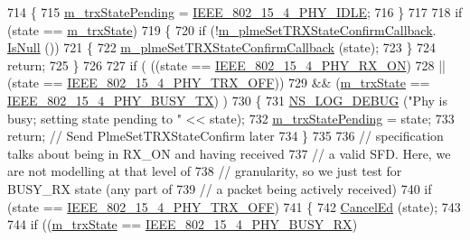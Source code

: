 \begin{DoxyCode}
714     \{
715       \hyperlink{classns3_1_1LrWpanPhy_a84647014f5242767e3358a6a851c81a7}{m\_trxStatePending} = \hyperlink{group__lr-wpan_gga6494269d13d45c511a07b7ccbb1de754af3994414efcd2fac7e312ecb9b3ebd70}{IEEE\_802\_15\_4\_PHY\_IDLE};
716     \}
717 
718   \textcolor{keywordflow}{if} (state == \hyperlink{classns3_1_1LrWpanPhy_a316704a4eb96e04f4b960ba3577fe0ce}{m\_trxState})
719     \{
720       \textcolor{keywordflow}{if} (!\hyperlink{classns3_1_1LrWpanPhy_ab3fed0e994f9e51e765c704f1a7b666f}{m\_plmeSetTRXStateConfirmCallback}.
      \hyperlink{classns3_1_1Callback_aa8e27826badbf37f84763f36f70d9b54}{IsNull} ())
721         \{
722           \hyperlink{classns3_1_1LrWpanPhy_ab3fed0e994f9e51e765c704f1a7b666f}{m\_plmeSetTRXStateConfirmCallback} (state);
723         \}
724       \textcolor{keywordflow}{return};
725     \}
726 
727   \textcolor{keywordflow}{if} ( ((state == \hyperlink{group__lr-wpan_gga6494269d13d45c511a07b7ccbb1de754a9480f69fea1a74b7961ed74d6b3e2f9e}{IEEE\_802\_15\_4\_PHY\_RX\_ON})
728         || (state == \hyperlink{group__lr-wpan_gga6494269d13d45c511a07b7ccbb1de754a4c0fd3882b68301deb8ce5b03109058f}{IEEE\_802\_15\_4\_PHY\_TRX\_OFF}))
729        && (\hyperlink{classns3_1_1LrWpanPhy_a316704a4eb96e04f4b960ba3577fe0ce}{m\_trxState} == \hyperlink{group__lr-wpan_gga6494269d13d45c511a07b7ccbb1de754a87f658959801356265b8c28a85569b15}{IEEE\_802\_15\_4\_PHY\_BUSY\_TX}) )
730     \{
731       \hyperlink{group__logging_ga413f1886406d49f59a6a0a89b77b4d0a}{NS\_LOG\_DEBUG} (\textcolor{stringliteral}{"Phy is busy; setting state pending to "} << state);
732       \hyperlink{classns3_1_1LrWpanPhy_a84647014f5242767e3358a6a851c81a7}{m\_trxStatePending} = state;
733       \textcolor{keywordflow}{return};  \textcolor{comment}{// Send PlmeSetTRXStateConfirm later}
734     \}
735 
736   \textcolor{comment}{// specification talks about being in RX\_ON and having received}
737   \textcolor{comment}{// a valid SFD.  Here, we are not modelling at that level of}
738   \textcolor{comment}{// granularity, so we just test for BUSY\_RX state (any part of}
739   \textcolor{comment}{// a packet being actively received)}
740   \textcolor{keywordflow}{if} (state == \hyperlink{group__lr-wpan_gga6494269d13d45c511a07b7ccbb1de754a4c0fd3882b68301deb8ce5b03109058f}{IEEE\_802\_15\_4\_PHY\_TRX\_OFF})
741     \{
742       \hyperlink{classns3_1_1LrWpanPhy_af05ebca568ec11ec5621f9d361d77295}{CancelEd} (state);
743 
744       \textcolor{keywordflow}{if} ((\hyperlink{classns3_1_1LrWpanPhy_a316704a4eb96e04f4b960ba3577fe0ce}{m\_trxState} == \hyperlink{group__lr-wpan_gga6494269d13d45c511a07b7ccbb1de754a09f430974fda07ac7d4d483a1ce23b98}{IEEE\_802\_15\_4\_PHY\_BUSY\_RX})

\end{DoxyCode}
